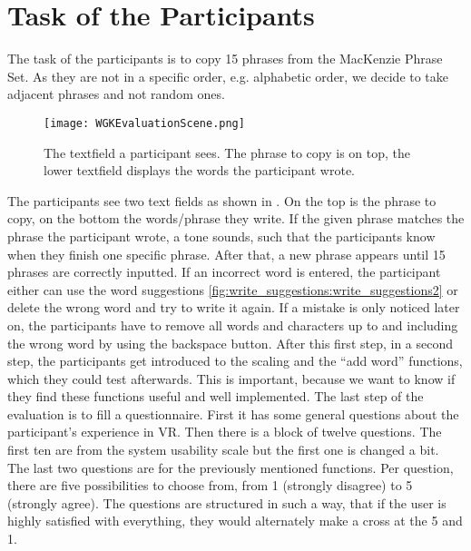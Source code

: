 \section{Task of the Participants}
The task of the participants is to copy 15 phrases from the MacKenzie Phrase Set. As they are not in a specific order, e.g. alphabetic order, we decide to take adjacent phrases and not random ones.
\begin{figure}[H]
    \centering
    \texttt{[image: WGKEvaluationScene.png]}
    \caption{The textfield a participant sees. The phrase to copy is on top, the lower textfield displays the words the participant wrote.}
    \label{fig:eval_scene}
\end{figure}
The participants see two text fields as shown in . On the top is the phrase to copy, on the bottom the words/phrase they write. If the given phrase matches the phrase the participant wrote, a tone sounds, such that the participants know when they finish one specific phrase. After that, a new phrase appears until 15 phrases are correctly inputted. If an incorrect word is entered, the participant either can use the word suggestions \cref{fig:write_suggestions:write_suggestions2} or delete the wrong word and try to write it again. If a mistake is only noticed later on, the participants have to remove all words and characters up to and including the wrong word by using the backspace button.\label{sec:eva_task} After this first step, in a second step, the participants get introduced to the scaling and the ``add word'' functions, which they could test afterwards. This is important, because we want to know if they find these functions useful and well implemented. The last step of the evaluation is to fill a questionnaire. First it has some general questions about the participant's experience in VR. Then there is a block of twelve questions. The first ten are from the system usability scale but the first one is changed a bit. The last two questions are for the previously mentioned functions. Per question, there are five possibilities to choose from, from 1 (strongly disagree) to 5 (strongly agree). The questions are structured in such a way, that if the user is highly satisfied with everything, they would alternately make a cross at the 5 and 1.

